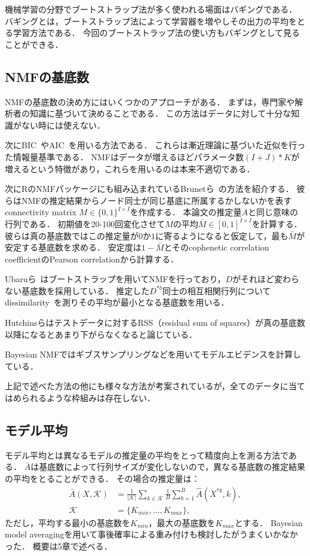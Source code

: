 機械学習の分野でブートストラップ法が多く使われる場面はバギング\cite{Breiman1996}である．
バギングとは，ブートストラップ法によって学習器を増やしその出力の平均をとる学習方法である．
今回のブートストラップ法の使い方もバギングとして見ることができる．

\subsection{NMFの基底数}
NMFの基底数の決め方にはいくつかのアプローチがある．
まずは，専門家や解析者の知識に基づいて決めることである．
この方法はデータに対して十分な知識がない時には使えない．

次にBIC~\cite{wasserman2000a}やAIC~\cite{Akaike1974}を用いる方法である．
これらは漸近理論に基づいた近似を行った情報量基準である．
NMFはデータが増えるほどパラメータ数$(I + J) * K$が増えるという特徴があり，これらを用いるのは本来不適切である．

次にRのNMFパッケージにも組み込まれているBrunetら~\cite{Brunet2004}の方法を紹介する．
彼らはNMFの推定結果からノード同士が同じ基底に所属するかしないかを表すconnectivity matrix $M \in \{0, 1\}^{I \times I}$を作成する．
本論文の推定量$A$と同じ意味の行列である．
初期値を20-100回変化させて$M$の平均$\bar{M} \in [0, 1]^{I \times I}$を計算する．
彼らは真の基底数ではこの推定量が$0$か$1$に寄るようになると仮定して，最も$\bar{M}$が安定する基底数を求める．
安定度は$1- \bar{M}$とそのcophenetic correlation coefficientのPearson correlationから計算する．

Ubaruら~\cite{Ubaru2017}はブートストラップを用いてNMFを行っており，$D$がそれほど変わらない基底数を採用している．
推定した$D^{*b}$同士の相互相関行列についてdissimilarity~\cite{Wu}を測りその平均が最小となる基底数を用いる．

Hutchinsらはテストデータに対するRSS（residual sum of squares）が真の基底数以降になるとあまり下がらなくなると論じている\cite{Hutchins2008}．

Bayesian NMFではギブスサンプリングなどを用いてモデルエビデンスを計算している\cite{Cemgil2009}．

上記で述べた方法の他にも様々な方法が考案されているが，全てのデータに当てはめられるような枠組みは存在しない．

\subsection{モデル平均}
モデル平均とは異なるモデルの推定量の平均をとって精度向上を測る方法である．
$\bar{A}$は基底数によって行列サイズが変化しないので，異なる基底数の推定結果の平均をとることができる．
その場合の推定量は：
\begin{align}
	\bar{A}(X,\mathcal{K}) &= \frac{1}{|\mathcal{K}|} \sum_{k \in \mathcal{K}} \frac{1}{B} \sum_{b=1}^B \hat{A}(X^{*b}, k),\\
	\mathcal{K} &= \{K_{min}, \dots, K_{max}\},
\end{align}
ただし，平均する最小の基底数を$K_{min}$，最大の基底数を$K_{max}$とする．
Bayesian model averagingを用いて事後確率による重み付けも検討したがうまくいかなかった．
概要は5章で述べる．

